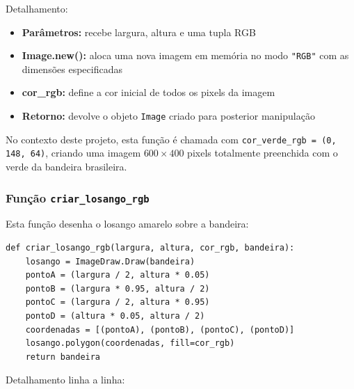 \documentclass{article}
\begin{document}
Detalhamento:
\begin{itemize}
    \item \textbf{Parâmetros:} recebe largura, altura e uma tupla RGB
    \item \textbf{Image.new():} aloca uma nova imagem em memória no modo \texttt{"RGB"} com as dimensões especificadas
    \item \textbf{cor\_rgb:} define a cor inicial de todos os pixels da imagem
    \item \textbf{Retorno:} devolve o objeto \texttt{Image} criado para posterior manipulação
\end{itemize}

No contexto deste projeto, esta função é chamada com \texttt{cor\_verde\_rgb = (0, 148, 64)}, criando uma imagem $600 \times 400$ pixels totalmente preenchida com o verde da bandeira brasileira.

\subsubsection{Função \texttt{criar\_losango\_rgb}}

Esta função desenha o losango amarelo sobre a bandeira:

\begin{lstlisting}[style=pythonstyle]
def criar_losango_rgb(largura, altura, cor_rgb, bandeira):
    losango = ImageDraw.Draw(bandeira)
    pontoA = (largura / 2, altura * 0.05)
    pontoB = (largura * 0.95, altura / 2)
    pontoC = (largura / 2, altura * 0.95)
    pontoD = (altura * 0.05, altura / 2)
    coordenadas = [(pontoA), (pontoB), (pontoC), (pontoD)]
    losango.polygon(coordenadas, fill=cor_rgb)
    return bandeira
\end{lstlisting}

Detalhamento linha a linha:
\end{document}
